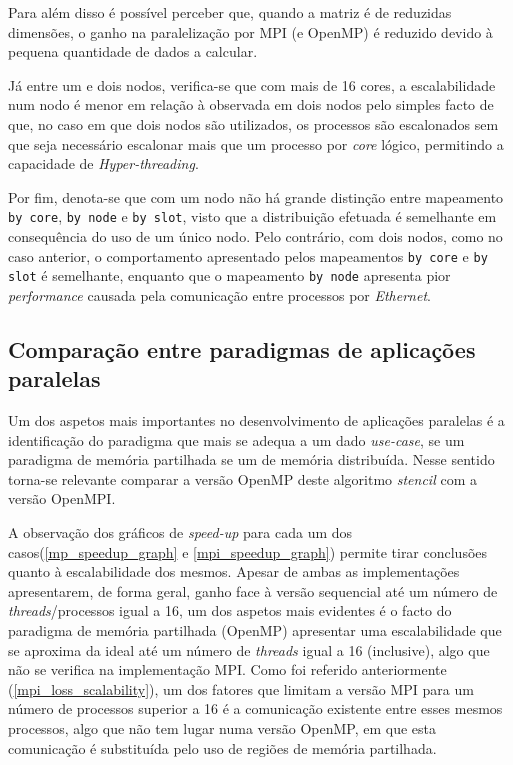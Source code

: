 \documentclass{article}
\begin{document}
Para além disso é possível perceber que, quando a matriz é de reduzidas dimensões, o ganho na paralelização por MPI
(e OpenMP) é reduzido devido à pequena quantidade de dados a calcular.

Já entre um e dois nodos, verifica-se que com mais de 16 cores, a escalabilidade num nodo é menor em relação à observada em dois 
nodos pelo simples facto de que, no caso em que dois nodos são utilizados, os processos são escalonados sem que seja
necessário escalonar mais que um processo por \textit{core} lógico, permitindo a capacidade de \textit{Hyper-threading}.

Por fim, denota-se que com um nodo não há grande distinção entre mapeamento \texttt{by core}, \texttt{by node} e \texttt{by slot}, 
visto que a distribuição efetuada é semelhante em consequência do uso de um único nodo.
Pelo contrário, com dois nodos, como no caso anterior, o comportamento apresentado pelos mapeamentos \texttt{by core} e \texttt{by slot} é semelhante, enquanto que o mapeamento \texttt{by node} apresenta pior \textit{performance} causada pela comunicação entre processos por \textit{Ethernet}.


\subsection{Comparação entre paradigmas de aplicações paralelas}
Um dos aspetos mais importantes no desenvolvimento de aplicações paralelas é a identificação do paradigma que mais
se adequa a um dado \textit{use-case}, se um paradigma de memória partilhada se um de memória distribuída.
Nesse sentido torna-se relevante comparar a versão OpenMP deste algoritmo \textit{stencil} com a versão
OpenMPI.

A observação dos gráficos de \textit{speed-up} para cada um dos casos(\ref{mp_speedup_graph} e 
\ref{mpi_speedup_graph}) permite tirar conclusões quanto à escalabilidade dos mesmos. Apesar de ambas as
implementações apresentarem, de forma geral, ganho face à versão sequencial até um número de \textit{threads}/processos 
igual a 16, um dos aspetos mais evidentes é o facto do paradigma de memória partilhada (OpenMP) apresentar uma 
escalabilidade que se aproxima da ideal até um número de \textit{threads} igual a 16 (inclusive), algo que não 
se verifica na implementação MPI. Como foi referido anteriormente (\ref{mpi_loss_scalability}), um dos fatores
que limitam a versão MPI para um número de processos superior a 16 é a comunicação existente entre esses mesmos
processos, algo que não tem lugar numa versão OpenMP, em que esta comunicação é substituída pelo uso de regiões 
de memória partilhada. 
\end{document}
